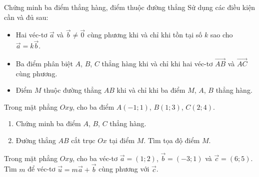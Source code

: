 \begin{dang}%
{Chứng minh ba điểm thẳng hàng, điểm thuộc đường thẳng}
Sử dụng các điều kiện cần và đủ sau:
\begin{itemize}
\item Hai véc-tơ $\vec{a}$ và $\vec{b} \neq \vec{0}$ cùng phương khi và chỉ khi tồn tại số $k$ sao cho $\vec{a}=k\vec{b}$.
\item Ba điểm phân biệt $A$, $B$, $C$ thẳng hàng khi và chỉ khi hai véc-tơ $\vec{AB}$ và $\vec{AC}$ cùng phương.
\item Điểm $M$ thuộc đường thẳng $AB$ khi và chỉ khi ba điểm $M$, $A$, $B$ thẳng hàng.
\end{itemize}
\end{dang}
\begin{vd}%
Trong mặt phẳng $Oxy$, cho ba điểm $A(-1;1)$, $B(1;3)$, $C(2;4)$.
\begin{enumerate}[\bfseries a)]
\item Chứng minh ba điểm $A$, $B$, $C$ thẳng hàng.
\item Đường thẳng $AB$ cắt trục $Ox$ tại điểm $M$. Tìm tọa độ điểm $M$.
\end{enumerate}
\end{vd}
\begin{vd}%
Trong mặt phẳng $Oxy$, cho ba véc-tơ $\vec{a}=(1;2)$, $\vec{b}=(-3;1)$ và $\vec{c}=(6;5)$. Tìm $m$ để véc-tơ $\vec{u}=m\vec{a}+\vec{b}$ cùng phương với $\vec{c}$.
\end{vd}
